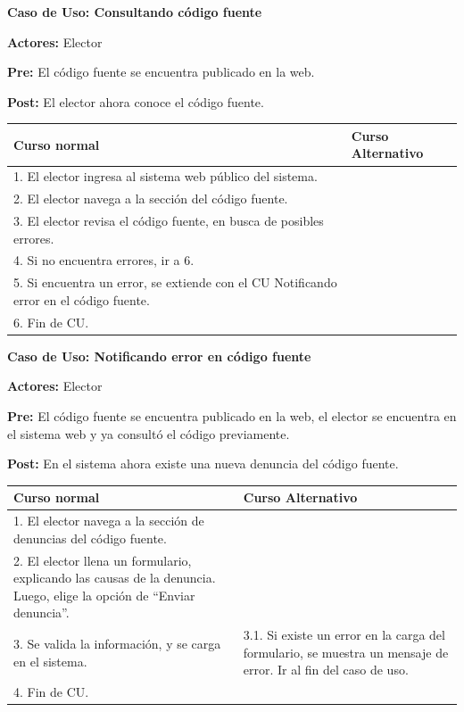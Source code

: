 \textbf{Caso de Uso: Consultando código fuente}

\textbf{Actores:} Elector

\textbf{Pre:} El código fuente se encuentra publicado en la web.

\textbf{Post:} El elector ahora conoce el código fuente.

\begin{table}[h!]
	
 \begin{tabular}{|p{7.5cm} | p{7.5cm}|} 
 \hline
 \textbf{Curso normal} & \textbf{Curso Alternativo} \\
 \hline
1. El elector ingresa al sistema web público del sistema. & \\
 \hline


2. El elector navega a la sección del código fuente. & \\
 \hline


3. El elector revisa el código fuente, en busca de posibles errores. & \\
 \hline


4. Si no encuentra errores, ir a 6. & \\
 \hline


5. Si encuentra un error, se extiende con el CU Notificando error en el código fuente. & \\
 \hline


6. Fin de CU. & \\
 \hline

 \end{tabular}

\end{table}


\textbf{Caso de Uso: Notificando error en código fuente}

\textbf{Actores:}  Elector

\textbf{Pre:} El código fuente se encuentra publicado en la web, el elector se encuentra en el sistema web y ya consultó el código previamente.

\textbf{Post:} En el sistema ahora existe una nueva denuncia del código fuente.
\begin{table}[h!]
	
 \begin{tabular}{|p{7.5cm} | p{7.5cm}|} 
 \hline
 \textbf{Curso normal} & \textbf{Curso Alternativo} \\
 \hline
1. El elector navega a la sección de denuncias del código fuente. & \\
\hline


2. El elector llena un formulario, explicando las causas de la denuncia. Luego, elige la opción de “Enviar denuncia”. & \\
\hline


3. Se valida la información, y se carga en el sistema. & 3.1. Si existe un error en la carga del formulario, se muestra un mensaje de error. Ir al fin del caso de uso. \\
\hline
4. Fin de CU.& \\
\hline
 \end{tabular}

\end{table}



